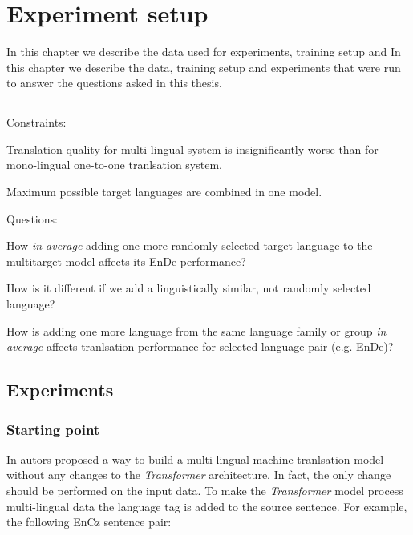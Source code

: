 \chapter{Experiment setup}
\label{chapter:experiment_setup}

In this chapter we describe the data used for experiments, training setup and In this chapter we describe the data, training setup and experiments that were run to answer the questions asked in this thesis.

\section{}
\label{section:questions_and_constraints}

Constraints:
\begin{displayquote}
	Translation quality for multi-lingual system is insignificantly worse than for
	mono-lingual one-to-one tranlsation system.

	Maximum possible target languages are combined in one model.
\end{displayquote}

Questions:
\begin{displayquote}
	How \emph{in average} adding one more randomly selected target language
	to the multitarget model affects its En\to{}De performance?

	How is it different if we add a linguistically similar, not randomly selected language?

	How is adding one more language from the same language family or group 
	\emph{in average} affects tranlsation performance for selected language
	pair (e.g. En\to{}De)?
\end{displayquote}



\section{Experiments}
\label{section:experiments}
\subsection{Starting point}
\label{subsection:starting_point}

In \cite{johnson-etal-2017-googles} autors proposed a way to build a multi-lingual
machine tranlsation model without any changes to the \emph{Transformer} architecture.
In fact, the only change should be performed on the input data. To make the \emph{Transformer}
model process multi-lingual data the language tag is added to the source sentence.
For example, the following En\to{}Cz sentence pair:

